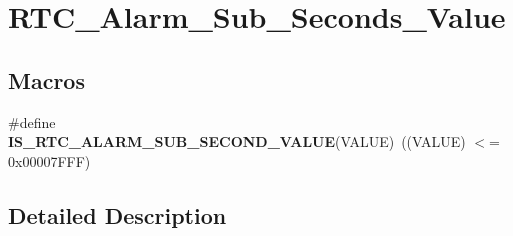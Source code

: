 \hypertarget{group___r_t_c___alarm___sub___seconds___value}{\section{R\-T\-C\-\_\-\-Alarm\-\_\-\-Sub\-\_\-\-Seconds\-\_\-\-Value}
\label{group___r_t_c___alarm___sub___seconds___value}
}
\subsection*{Macros}
\begin{DoxyCompactItemize}
\item 
\hypertarget{group___r_t_c___alarm___sub___seconds___value_gae7cd07c18cdb2946a2b06f6606ede93c}{\#define {\bfseries I\-S\-\_\-\-R\-T\-C\-\_\-\-A\-L\-A\-R\-M\-\_\-\-S\-U\-B\-\_\-\-S\-E\-C\-O\-N\-D\-\_\-\-V\-A\-L\-U\-E}(V\-A\-L\-U\-E)~((V\-A\-L\-U\-E) $<$= 0x00007\-F\-F\-F)}\label{group___r_t_c___alarm___sub___seconds___value_gae7cd07c18cdb2946a2b06f6606ede93c}

\end{DoxyCompactItemize}


\subsection{Detailed Description}
